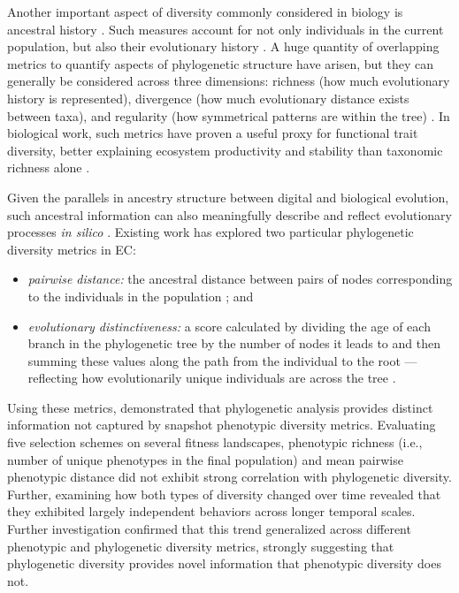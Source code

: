 Another important aspect of diversity commonly considered in biology is ancestral history \citep{faith1992conservation}.
Such measures account for not only individuals in the current population, but also their evolutionary history \citep{tucker2018relationship}.
A huge quantity of overlapping metrics to quantify aspects of phylogenetic structure have arisen, but they can generally be considered across three dimensions: richness (how much evolutionary history is represented), divergence (how much evolutionary distance exists between taxa), and regularity (how symmetrical patterns are within the tree) \citep{tucker2016guide}.
In biological work, such metrics have proven a useful proxy for functional trait diversity, better explaining ecosystem productivity and stability than taxonomic richness alone \citep{webb2002phylogenies,cadotte2008evolutionary,srivastava2012phylogenetic}.

Given the parallels in ancestry structure between digital and biological evolution, such ancestral information can also meaningfully describe and reflect evolutionary processes \textit{in silico} \citep{dolson2020interpreting}.
Existing work has explored two particular phylogenetic diversity metrics in EC:
\begin{itemize}
    \item \textit{pairwise distance:} the ancestral distance between pairs of nodes corresponding to the individuals in the population \citep{webb2002phylogenies}; and
    \item \textit{evolutionary distinctiveness:} a score calculated by dividing the age of each branch in the phylogenetic tree by the number of nodes it leads to and then summing these values along the path from the individual to the root --- reflecting how evolutionarily unique individuals are across the tree \citep{isaac2007mammals}.
\end{itemize}

Using these metrics, \citet{hernandez2022can} demonstrated that phylogenetic analysis provides distinct information not captured by snapshot phenotypic diversity metrics. %
Evaluating five selection schemes on several fitness landscapes, phenotypic richness (i.e., number of unique phenotypes in the final population) and mean pairwise phenotypic distance did not exhibit strong correlation with phylogenetic diversity.
Further, examining how both types of diversity changed over time revealed that they exhibited largely independent behaviors across longer temporal scales.
Further investigation confirmed that this trend generalized across different phenotypic and phylogenetic diversity metrics, strongly suggesting that phylogenetic diversity provides novel information that phenotypic diversity does not.

